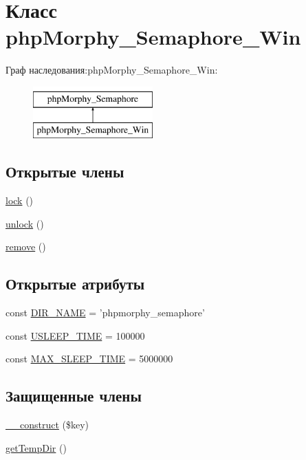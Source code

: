 \hypertarget{classphpMorphy__Semaphore__Win}{
\section{Класс phpMorphy\_\-Semaphore\_\-Win}
\label{classphpMorphy__Semaphore__Win}
}
Граф наследования:phpMorphy\_\-Semaphore\_\-Win:\begin{figure}[H]
\begin{center}
\leavevmode
\includegraphics[height=2.000000cm]{classphpMorphy__Semaphore__Win}
\end{center}
\end{figure}
\subsection*{Открытые члены}
\begin{DoxyCompactItemize}
\item 
\hyperlink{classphpMorphy__Semaphore__Win_ab5c771c8b53314cbb77351ab12a78b0a}{lock} ()
\item 
\hyperlink{classphpMorphy__Semaphore__Win_a4443161bd6f484f530ab92a8b0b5b15c}{unlock} ()
\item 
\hyperlink{classphpMorphy__Semaphore__Win_aac7eb720d9ac7c314a4268934225a447}{remove} ()
\end{DoxyCompactItemize}
\subsection*{Открытые атрибуты}
\begin{DoxyCompactItemize}
\item 
const \hyperlink{classphpMorphy__Semaphore__Win_ad73b3c535ed20b9a350dcea2123250ac}{DIR\_\-NAME} = 'phpmorphy\_\-semaphore'
\item 
const \hyperlink{classphpMorphy__Semaphore__Win_a6afe18891fb3f4d4ad8850f369a11091}{USLEEP\_\-TIME} = 100000
\item 
const \hyperlink{classphpMorphy__Semaphore__Win_a4f13df681228ae25952138822d85586a}{MAX\_\-SLEEP\_\-TIME} = 5000000
\end{DoxyCompactItemize}
\subsection*{Защищенные члены}
\begin{DoxyCompactItemize}
\item 
\hyperlink{classphpMorphy__Semaphore__Win_a604921fab22c0734566b1fa403307517}{\_\-\_\-construct} (\$key)
\item 
\hyperlink{classphpMorphy__Semaphore__Win_a226efc78eac1d0fa38e46a61570c669a}{getTempDir} ()
\end{DoxyCompactItemize}
